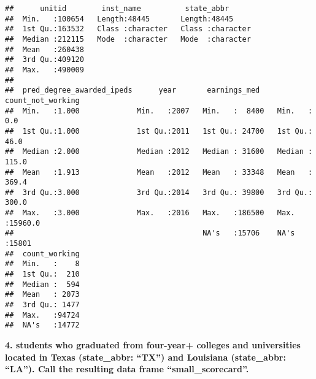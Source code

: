 \documentclass[
]{article}
\newenvironment{Shaded}{\begin{snugshade}}{\end{snugshade}}
\newcommand{\CommentTok}[1]{\textcolor[rgb]{0.56,0.35,0.01}{\textit{#1}}}
\newcommand{\DecValTok}[1]{\textcolor[rgb]{0.00,0.00,0.81}{#1}}
\newcommand{\FunctionTok}[1]{\textcolor[rgb]{0.00,0.00,0.00}{#1}}
\newcommand{\NormalTok}[1]{#1}
\newcommand{\OtherTok}[1]{\textcolor[rgb]{0.56,0.35,0.01}{#1}}
\newcommand{\SpecialCharTok}[1]{\textcolor[rgb]{0.00,0.00,0.00}{#1}}
\newcommand{\StringTok}[1]{\textcolor[rgb]{0.31,0.60,0.02}{#1}}
\begin{document}
\begin{verbatim}
##      unitid        inst_name          state_abbr       
##  Min.   :100654   Length:48445       Length:48445      
##  1st Qu.:163532   Class :character   Class :character  
##  Median :212115   Mode  :character   Mode  :character  
##  Mean   :260438                                        
##  3rd Qu.:409120                                        
##  Max.   :490009                                        
##                                                        
##  pred_degree_awarded_ipeds      year       earnings_med    count_not_working
##  Min.   :1.000             Min.   :2007   Min.   :  8400   Min.   :    0.0  
##  1st Qu.:1.000             1st Qu.:2011   1st Qu.: 24700   1st Qu.:   46.0  
##  Median :2.000             Median :2012   Median : 31600   Median :  115.0  
##  Mean   :1.913             Mean   :2012   Mean   : 33348   Mean   :  369.4  
##  3rd Qu.:3.000             3rd Qu.:2014   3rd Qu.: 39800   3rd Qu.:  300.0  
##  Max.   :3.000             Max.   :2016   Max.   :186500   Max.   :15960.0  
##                                           NA's   :15706    NA's   :15801    
##  count_working  
##  Min.   :    8  
##  1st Qu.:  210  
##  Median :  594  
##  Mean   : 2073  
##  3rd Qu.: 1477  
##  Max.   :94724  
##  NA's   :14772
\end{verbatim}

\textbf{4. students who graduated from four-year+ colleges and
universities located in Texas (state\_abbr: ``TX'') and Louisiana
(state\_abbr: ``LA''). Call the resulting data frame
``small\_scorecard''.}

\begin{Shaded}
\end{Shaded}
\end{document}
